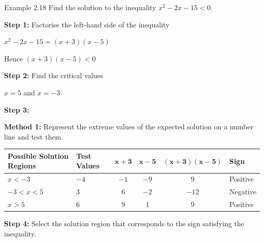 \begin{example}{Example 2.18}
Find the solution to the inequality $x^2 - 2x - 15 < 0$.

\solution
\textbf{Step 1:} Factorise the left-hand side of the inequality

$x^2 - 2x - 15 = (x + 3)(x - 5)$

Hence $(x + 3)(x - 5) < 0$

\textbf{Step 2:} Find the critical values

$x = 5$ and $x = -3$

\textbf{Step 3:}

\textbf{Method 1:} Represent the extreme values of the expected solution on a number
line and test them.
\begin{center}
\end{center}

\begin{center}
\small\setlength{\tabcolsep}{4pt}
\begin{tabular}{|p{2.7cm}|p{1.4cm}|c|c|c|l|}
\hline
\textbf{Possible Solution Regions} & \textbf{Test Values} & $\boldsymbol{x + 3}$ &
$\boldsymbol{x - 5}$ & $\boldsymbol{(x + 3)(x - 5)}$ & \textbf{Sign} \\
\hline
$x < -3$ & $-4$ & $-1$ & $-9$ & 9 & Positive \\
\hline
$-3 < x < 5$ & 3 & 6 & $-2$ & $-12$ & Negative \\
\hline
$x > 5$ & 6 & 9 & 1 & 9 & Positive \\
\hline
\end{tabular}
\end{center}

\textbf{Step 4:} Select the solution region that corresponds to the sign satisfying the
inequality.


\end{example}
